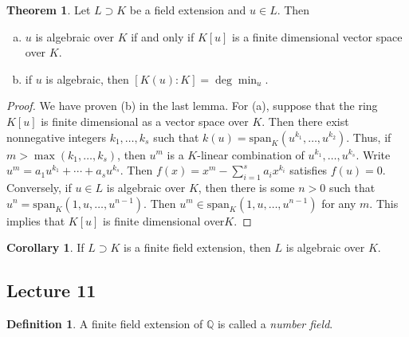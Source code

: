 \documentclass[10pt,letterpaper,cm]{nupset}
\theoremstyle{definition}
\newtheorem*{definition}{Definition}
\newtheorem{theorem}{Theorem}
\newtheorem{corollary}{Corollary}
\newcommand{\Q}{\mathbb Q}
\newcommand{\1}{\mathbf{1}}
\newcommand{\0}{\vec 0}
\begin{document}
\begin{theorem}
Let $L \supset K$ be a field extension and $u\in L$.  Then 
\begin{enumerate}[(a)]
\item $u$ is algebraic over $K$ if and only if $K[u]$ is a finite dimensional vector space over $K$.
\item if $u$ is algebraic, then $[K(u) : K] = \deg{\min_u}$. 
\end{enumerate}
\end{theorem}
\begin{proof}
We have proven (b) in the last lemma. For (a), suppose that the ring $K[u]$ is finite dimensional as a vector space over $K$. Then there exist nonnegative integers $k_1, \ldots, k_s$ such that $k(u) = \text{span}_K(u^{k_1}, \ldots, u^{k_2})$. Thus, if $m > \max(k_1, \ldots, k_s)$, then $u^m$ is a $K$-linear combination of $u^{k_1}, \ldots, u^{k_s}$. Write $u^m = a_1u^{k_1} + \cdots + a_s u^{k_s}$. Then $f(x) = x^m - \sum_{i=1}^s a_i x^{k_i}$ satisfies  $f(u) = 0$. Conversely, if $u\in L$ is algebraic over $K$, then there is some $n>0$ such that $u^n = \text{span}_K(1, u, \ldots, u^{n-1})$. Then $u^m \in \text{span}_K(1, u, \ldots, u^{n-1})$ for any $m$. This implies that $K[u]$ is finite dimensional over$K$.
\end{proof}

\begin{corollary}
If $L\supset K$ is a finite field extension, then $L$ is algebraic over $K$.
\end{corollary}

\subsection{Lecture 11}

\begin{definition}
A finite field extension of $\Q$ is called a \textit{number field}.
\end{definition}
\end{document}
